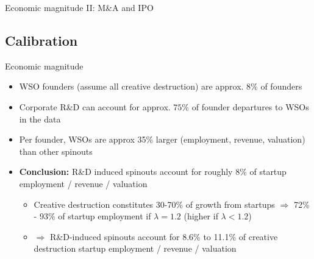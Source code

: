 \documentclass[english,usenames,dvipsnames]{beamer}
\begin{document}
\begin{frame}{Economic magnitude II: M\&A and IPO}\label{regs_startup_lifecycle_successfullyexiting}
	\hyperlink{economic_magnitude}{}
	\begin{table}[!htb]
		\Tiny
		\centering
		
		\caption{\footnotesize Dependent variable is an indicator for the startup being acquired or having an IPO in that year. Indepdendent variable is fraction of founders whose previous employer was in the same industry.} 
		\label{table:startupLifeCycle_founder2founders_successfullyexiting}
	\end{table}
\end{frame}


\subsection{Calibration}

\begin{frame}{Economic magnitude}\label{economic_magnitude}
	\hyperlink{calibration_targets}{}
	\begin{itemize}
		\item WSO founders (assume all creative destruction) are approx. $8\%$ of founders  \hyperlink{results_of_match}{}
		\item Corporate R\&D can account for approx. $75\%$ of founder departures to WSOs in the data \hyperlink{regs_economic_significance}{}
		\item Per founder, WSOs are approx 35\% larger (employment, revenue, valuation) than other spinouts \hyperlink{regs_startup_lifecycle_employment}{} \hyperlink{regs_startup_lifecycle_revenue}{} \hyperlink{regs_startup_lifecycle_valuation}{}  \hyperlink{regs_startup_lifecycle_goingoutofbusiness}{} \hyperlink{regs_startup_lifecycle_successfullyexiting}{} 
		\item \alert{\textbf{Conclusion:}} R\&D induced spinouts account for roughly 8\% of startup employment / revenue / valuation 
		\begin{itemize}
			\item Creative destruction constitutes 30-70\% of growth from startups $\Rightarrow$ 72\% - 93\% of startup employment if $\lambda = 1.2$ (higher if $\lambda < 1.2$)
			\item $\Rightarrow$ R\&D-induced spinouts account for 8.6\% to 11.1\% of creative destruction startup employment / revenue / valuation
		\end{itemize}
	\end{itemize}
\end{frame}
\end{document}
